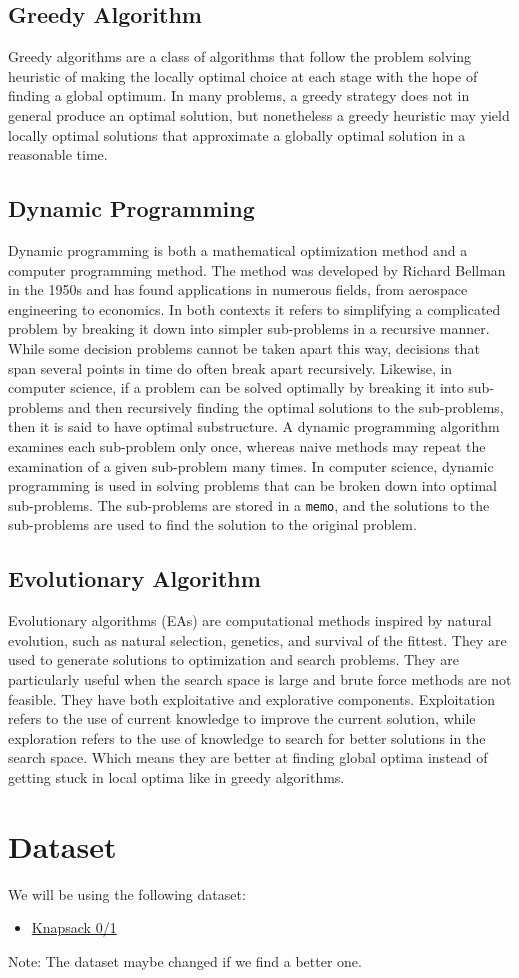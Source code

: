 \documentclass{article}
\begin{document}
\subsection*{Greedy Algorithm}
Greedy algorithms are a class of algorithms that follow the problem solving heuristic of making the locally optimal choice at each stage with the hope of finding a global optimum. In many problems, a greedy strategy does not in general produce an optimal solution, but nonetheless a greedy heuristic may yield locally optimal solutions that approximate a globally optimal solution in a reasonable time.

\subsection*{Dynamic Programming}
Dynamic programming is both a mathematical optimization method and a computer programming method. The method was developed by Richard Bellman in the 1950s and has found applications in numerous fields, from aerospace engineering to economics. In both contexts it refers to simplifying a complicated problem by breaking it down into simpler sub-problems in a recursive manner. While some decision problems cannot be taken apart this way, decisions that span several points in time do often break apart recursively.
Likewise, in computer science, if a problem can be solved optimally by breaking it into sub-problems and then recursively finding the optimal solutions to the sub-problems, then it is said to have optimal substructure. A dynamic programming algorithm examines each sub-problem only once, whereas naive methods may repeat the examination of a given sub-problem many times. In computer science, dynamic programming is used in solving problems that can be broken down into optimal sub-problems.
The sub-problems are stored in a \texttt{memo}, and the solutions to the sub-problems are used to find the solution to the original problem.

\subsection*{Evolutionary Algorithm}
Evolutionary algorithms (EAs) are computational methods inspired by natural evolution, such as natural selection, genetics, and survival of the fittest. They are used to generate solutions to optimization and search problems. They are particularly useful when the search space is large and brute force methods are not feasible. They have both exploitative and explorative components. Exploitation refers to the use of current knowledge to improve the current solution, while exploration refers to the use of knowledge to search for better solutions in the search space. Which means they are better at finding global optima instead of getting stuck in local optima like in greedy algorithms.
\section*{Dataset}
We will be using the following dataset:

\begin{itemize}
    \item \href{https://people.sc.fsu.edu/~jburkardt/datasets/knapsack_01/knapsack_01.html}{Knapsack 0/1}
\end{itemize}

Note: The dataset maybe changed if we find a better one.
\end{document}

